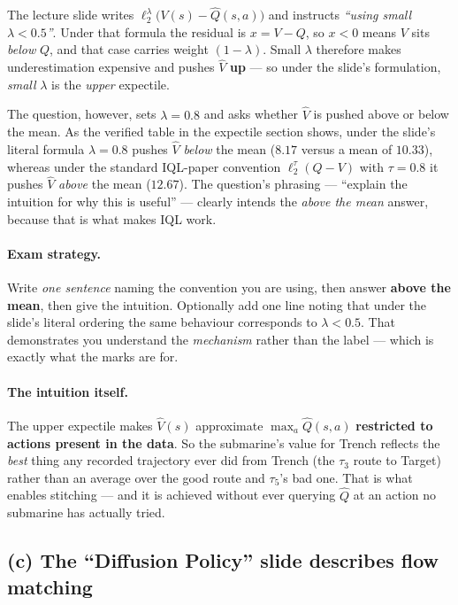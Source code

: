 \documentclass[11pt,a4paper]{article}
\begin{document}
The lecture slide writes $\ell_2^\lambda\bigl(V(s)-\hat Q(s,a)\bigr)$ and
instructs \emph{``using small $\lambda<0.5$''}. Under that formula the
residual is $x=V-Q$, so $x<0$ means $V$ sits \emph{below} $Q$, and that case
carries weight $(1-\lambda)$. Small $\lambda$ therefore makes underestimation
expensive and pushes $\hat V$ \textbf{up} --- so under the slide's
formulation, \emph{small} $\lambda$ is the \emph{upper} expectile.

The question, however, sets $\lambda=0.8$ and asks whether $\hat V$ is pushed
above or below the mean. As the verified table in the expectile section
shows, under the slide's literal formula $\lambda=0.8$ pushes $\hat V$
\emph{below} the mean ($8.17$ versus a mean of $10.33$), whereas under the
standard IQL-paper convention $\ell_2^{\tau}(Q-V)$ with $\tau=0.8$ it pushes
$\hat V$ \emph{above} the mean ($12.67$). The question's phrasing --- ``explain
the intuition for why this is useful'' --- clearly intends the
\emph{above the mean} answer, because that is what makes IQL work.

\paragraph{Exam strategy.} Write \emph{one sentence} naming the convention you
are using, then answer \textbf{above the mean}, then give the intuition.
Optionally add one line noting that under the slide's literal ordering the
same behaviour corresponds to $\lambda<0.5$. That demonstrates you understand
the \emph{mechanism} rather than the label --- which is exactly what the marks
are for.

\paragraph{The intuition itself.} The upper expectile makes $\hat V(s)$
approximate $\max_a \hat Q(s,a)$ \textbf{restricted to actions present in the
data}. So the submarine's value for Trench reflects the \emph{best} thing any
recorded trajectory ever did from Trench (the $\tau_3$ route to Target) rather
than an average over the good route and $\tau_5$'s bad one. That is what
enables stitching --- and it is achieved without ever querying $\hat Q$ at an
action no submarine has actually tried.

\subsection{(c) The ``Diffusion Policy'' slide describes flow matching}
\end{document}
